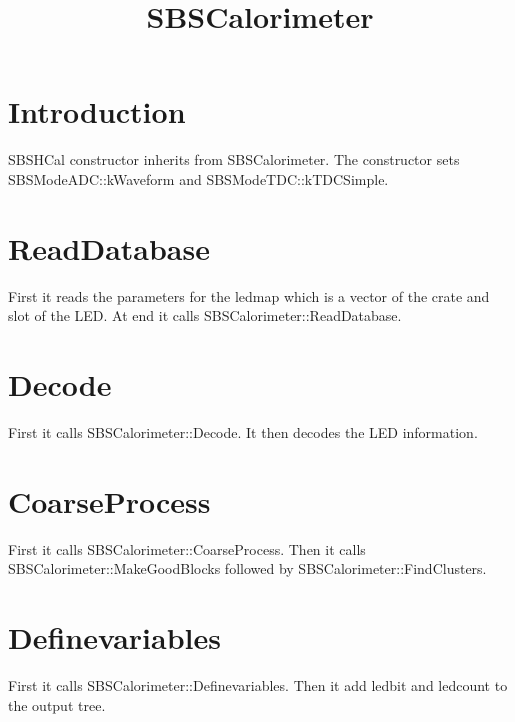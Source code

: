 \documentclass[11pt]{article}
\begin{document}
\title{SBSCalorimeter}
\maketitle

\section{Introduction}
SBSHCal constructor inherits from SBSCalorimeter. The constructor sets SBSModeADC::kWaveform
and SBSModeTDC::kTDCSimple. 

\section{ReadDatabase}
First it reads the parameters for the ledmap which is a vector of the crate and slot of the LED.
At end it calls SBSCalorimeter::ReadDatabase.

\section{Decode}
First it calls SBSCalorimeter::Decode. It then decodes the LED information.

\section{CoarseProcess}
First it calls SBSCalorimeter::CoarseProcess.
Then it calls  SBSCalorimeter::MakeGoodBlocks followed by SBSCalorimeter::FindClusters.

\section{Definevariables}
First it calls  SBSCalorimeter::Definevariables. Then it add ledbit and ledcount to the output tree.
\end{document}

